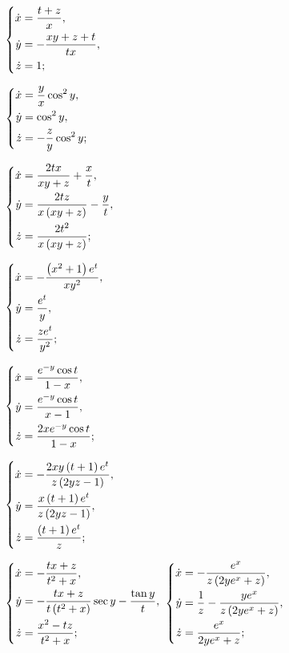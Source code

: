 	\begin{multicols}{3}
		\begin{enumtasks}

			\label{nonlinsys_systodes:systems3}
			\item \( \left\lbrace \begin{aligned}  \dot{x} &= \frac{t + z}{x}, \\ \dot{y} &= -\frac{xy + z + t}{tx}, \\ \dot{z} &= 1;  \end{aligned} \right. \) %
			\item \( \left\lbrace \begin{aligned}  \dot{x} &= \frac{y}{x} \cos^2{y}, \\ \dot{y} &= \cos^2{y}, \\ \dot{z} &= - \frac{z}{y} \cos^2{y};  \end{aligned} \right. \) %
			\item \( \left\lbrace \begin{aligned}  \dot{x} &= \frac{2tx}{xy + z} + \frac{x}{t}, \\ \dot{y} &= \frac{2tz}{x \left( xy + z \right)} - \frac{y}{t}, \\ \dot{z} &= \frac{2 t^2}{x \left( xy + z \right)};  \end{aligned} \right. \) %
			\item \( \left\lbrace \begin{aligned}  \dot{x} &= -\frac{\left( x^2 + 1 \right) e^{t}}{x y^2}, \\ \dot{y} &= \frac{e^t}{y}, \\ \dot{z} &= \frac{z e^t}{y^2};  \end{aligned} \right. \) %
			\item \( \left\lbrace \begin{aligned}  \dot{x} &= \frac{e^{-y} \cos{t}}{1 - x}, \\ \dot{y} &= \frac{e^{-y} \cos{t}}{x - 1}, \\ \dot{z} &= \frac{2xe^{-y} \cos{t}}{1 - x};  \end{aligned} \right. \) %
			\item \( \left\lbrace \begin{aligned}  \dot{x} &= - \frac{2xy \left( t + 1 \right) e^t}{z \left( 2yz - 1 \right)}, \\ \dot{y} &= \frac{x \left( t + 1 \right) e^t}{z \left( 2yz - 1 \right)}, \\ \dot{z} &= \frac{\left( t + 1 \right) e^t}{z};  \end{aligned} \right. \) %
			
		\end{enumtasks}
	\end{multicols}
	
	\begin{multicols}{2}
		\begin{enumtasks}

			\label{nonlinsys_systodes:systems3_hard}
			\itemstar \( \left\lbrace \begin{aligned}  \dot{x} &= - \frac{t x + z}{t^2 + x}, \\ \dot{y} &= -\frac{tx + z}{t \left( t^2 + x \right)} \sec{y} - \frac{\tan{y}}{t}, \\ \dot{z} &= \frac{x^2 - tz}{t^2 + x};  \end{aligned} \right. \) %
			\itemstar \( \left\lbrace \begin{aligned}  \dot{x} &= - \frac{e^x}{z \left( 2ye^x + z \right)}, \\ \dot{y} &= \frac{1}{z} - \frac{ye^x}{z \left( 2ye^x + z \right)}, \\ \dot{z} &= \frac{e^x}{2ye^x + z};  \end{aligned} \right. \) %

		\end{enumtasks}
	\end{multicols}

